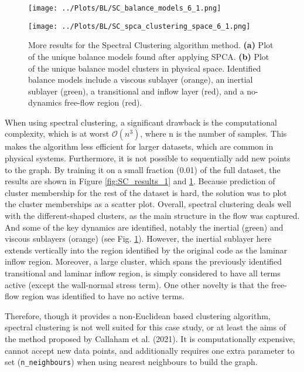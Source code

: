 \documentclass[12pt]{report} %
\begin{document}
\begin{figure}[htbp]
  \centering
  \begin{minipage}[b]{0.6\textwidth}
      \centering
      \texttt{[image: ../Plots/BL/SC\_balance\_models\_6\_1.png]}
      \subcaption{}
  \end{minipage}

  \begin{minipage}[b]{0.6\textwidth}
      \centering
      \texttt{[image: ../Plots/BL/SC\_spca\_clustering\_space\_6\_1.png]}
      \subcaption{}
  \end{minipage}

  \caption{More results for the Spectral Clustering algorithm method. \textbf{(a)} Plot of the unique balance models found after applying SPCA. \textbf{(b)} Plot of the unique balance model clusters in physical space. Identified balance models include a viscous sublayer (orange), an inertial sublayer (green), a transitional and inflow layer (red), and a no-dynamics free-flow region (red).}
  \label{fig:SC_results_2}
\end{figure}


When using spectral clustering, a significant drawback is the computational complexity, which is at worst $\mathcal{O}(n^3)$, where n is the number of samples. This makes the algorithm less efficient for larger datasets, which are common in physical systems. Furthermore, it is not possible to sequentially add new points to the graph. By training it on a small fraction (0.01) of the full dataset, the results are shown in Figure \ref{fig:SC_results_1} and \ref{fig:SC_results_2}. Because prediction of cluster membership for the rest of the dataset is hard, the solution was to plot the cluster memberships as a scatter plot. Overall, spectral clustering deals well with the different-shaped clusters, as the main structure in the flow was captured. And some of the key dynamics are identified, notably the inertial (green) and viscous sublayers (orange) (see Fig. \ref{fig:SC_results_2}). However, the inertial sublayer here extends vertically into the region identified by the original code as the laminar inflow region. Moreover, a large cluster, which spans the previously identified transitional and laminar inflow region, is simply considered to have all terms active (except the wall-normal stress term). One other novelty is that the free-flow region was identified to have no active terms.

Therefore, though it provides a non-Euclidean based clustering algorithm, spectral clustering is not well suited for this case study, or at least the aims of the method proposed by Callaham et al. (2021)\cite{callaham2021learning}. It is computationally expensive, cannot accept new data points, and additionally requires one extra parameter to set (\texttt{n\_neighbours}) when using nearest neighbours to build the graph.
\end{document}
